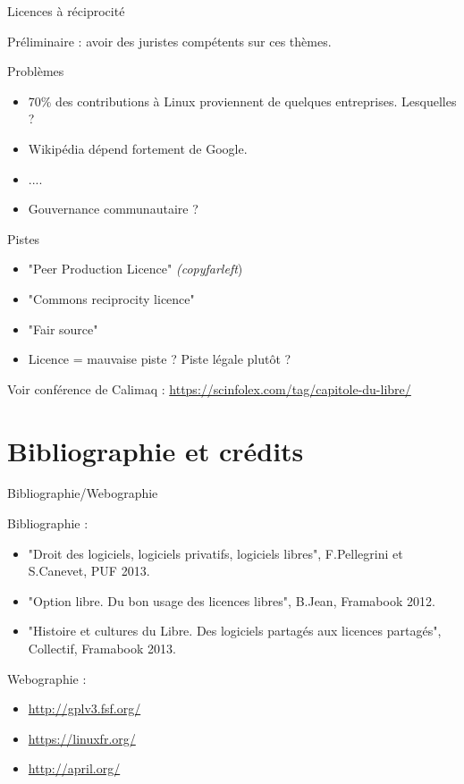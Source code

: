 \documentclass{beamer}
\begin{document}
\begin{frame}{Licences à réciprocité}

Préliminaire : avoir des juristes compétents sur ces thèmes.

  \begin{block}{Problèmes}
    \begin{itemize}
    \item 70\% des contributions à Linux proviennent de quelques entreprises. Lesquelles ?
    \item Wikipédia dépend fortement de Google.
    \item ....
    \item Gouvernance communautaire ? 
    \end{itemize}
  \end{block}

  \begin{block}{Pistes}
    \begin{itemize}
    \item "Peer Production Licence" \textit{(copyfarleft})
    \item "Commons reciprocity licence"
    \item "Fair source"
    \item Licence = mauvaise piste ? Piste légale plutôt ?
    \end{itemize}
  
  \end{block}
  
Voir conférence de Calimaq : \url{https://scinfolex.com/tag/capitole-du-libre/}
  
\end{frame}

\section{Bibliographie et crédits}

\begin{frame}{Bibliographie/Webographie}

Bibliographie :

  \begin{itemize}
  \item "Droit des logiciels, logiciels privatifs, logiciels libres", F.Pellegrini et S.Canevet, PUF 2013.
  \item "Option libre. Du bon usage des licences libres", B.Jean, Framabook 2012.
  \item "Histoire et cultures du Libre. Des logiciels partagés aux licences partagés", Collectif, Framabook 2013.
  \end{itemize}

Webographie :

\begin{itemize}
\item \url{http://gplv3.fsf.org/}
\item \url{https://linuxfr.org/}
\item \url{http://april.org/}
\end{itemize}
  
\end{frame}
\end{document}

